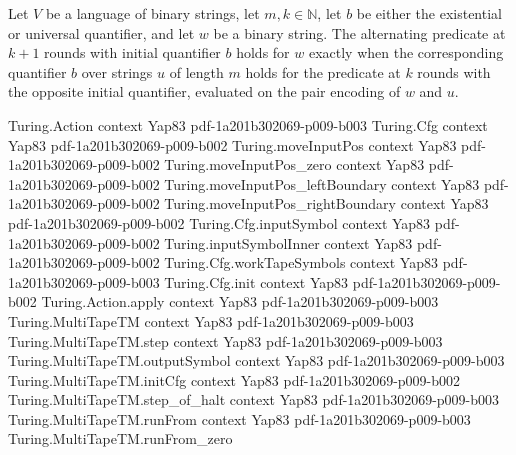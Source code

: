 \begin{theorem}
\label{Complexity.altQuant_succ}
\leanok
{}
Let $V$ be a language of binary strings, let $m,k\in\mathbb{N}$, let $b$ be either the
existential or universal quantifier, and let $w$ be a binary string. The alternating
predicate at $k+1$ rounds with initial quantifier $b$ holds for $w$ exactly when the
corresponding quantifier $b$ over strings $u$ of length $m$ holds for the predicate at
$k$ rounds with the opposite initial quantifier, evaluated on the pair encoding of $w$
and $u$.
\end{theorem}

\begin{theorem}
\label{Complexity.altQuant_true_succ}
\leanok
\proofstep
  {Turing.Action}
  {context}
  {Yap83}
  {pdf-1a201b302069-p009-b003}
\proofstep
  {Turing.Cfg}
  {context}
  {Yap83}
  {pdf-1a201b302069-p009-b002}
\proofstep
  {Turing.moveInputPos}
  {context}
  {Yap83}
  {pdf-1a201b302069-p009-b002}
\proofstep
  {Turing.moveInputPos_zero}
  {context}
  {Yap83}
  {pdf-1a201b302069-p009-b002}
\proofstep
  {Turing.moveInputPos_leftBoundary}
  {context}
  {Yap83}
  {pdf-1a201b302069-p009-b002}
\proofstep
  {Turing.moveInputPos_rightBoundary}
  {context}
  {Yap83}
  {pdf-1a201b302069-p009-b002}
\proofstep
  {Turing.Cfg.inputSymbol}
  {context}
  {Yap83}
  {pdf-1a201b302069-p009-b002}
\proofstep
  {Turing.inputSymbolInner}
  {context}
  {Yap83}
  {pdf-1a201b302069-p009-b002}
\proofstep
  {Turing.Cfg.workTapeSymbols}
  {context}
  {Yap83}
  {pdf-1a201b302069-p009-b003}
\proofstep
  {Turing.Cfg.init}
  {context}
  {Yap83}
  {pdf-1a201b302069-p009-b002}
\proofstep
  {Turing.Action.apply}
  {context}
  {Yap83}
  {pdf-1a201b302069-p009-b003}
\proofstep
  {Turing.MultiTapeTM}
  {context}
  {Yap83}
  {pdf-1a201b302069-p009-b003}
\proofstep
  {Turing.MultiTapeTM.step}
  {context}
  {Yap83}
  {pdf-1a201b302069-p009-b003}
\proofstep
  {Turing.MultiTapeTM.outputSymbol}
  {context}
  {Yap83}
  {pdf-1a201b302069-p009-b003}
\proofstep
  {Turing.MultiTapeTM.initCfg}
  {context}
  {Yap83}
  {pdf-1a201b302069-p009-b002}
\proofstep
  {Turing.MultiTapeTM.step_of_halt}
  {context}
  {Yap83}
  {pdf-1a201b302069-p009-b003}
\proofstep
  {Turing.MultiTapeTM.runFrom}
  {context}
  {Yap83}
  {pdf-1a201b302069-p009-b003}
\proofstep
  {Turing.MultiTapeTM.runFrom_zero}

\end{theorem}
